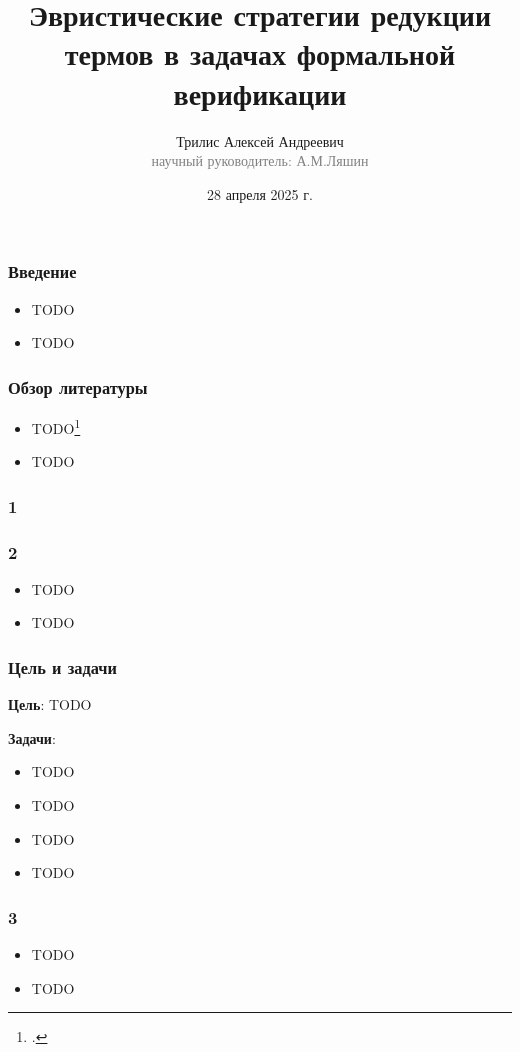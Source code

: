 \documentclass{beamer}
\begin{document}
\title[Стратегии редукции термов в верификации]{Эвристические стратегии редукции термов в задачах формальной верификации}
\author[Трилис А.А.]{Трилис Алексей Андреевич\\{\footnotesize\textcolor{gray}{научный руководитель: А.М.Ляшин}}}
\date{28 апреля 2025 г.}
\frame{\titlepage}

\begin{frame}\frametitle{Введение}
\begin{itemize}
  \item TODO
  \item TODO
\end{itemize}
\end{frame}

\lstset{language=haskell}
\begin{frame}\frametitle{Обзор литературы}
\begin{itemize}
  \item TODO\footcite{example}
  \item TODO
\end{itemize}
\end{frame}

\begin{frame}\frametitle{1}
\end{frame}

\begin{frame}\frametitle{2}
\begin{itemize}
  \item TODO
  \item TODO
\end{itemize}
\end{frame}

\begin{frame}\frametitle{Цель и задачи}
\textbf{Цель}: TODO

\textbf{Задачи}:
\begin{itemize}
  \item TODO
  \item TODO
  \item TODO
  \item TODO
\end{itemize}
\end{frame}

\begin{frame}\frametitle{3}
\begin{itemize}
  \item TODO
  \item TODO
\end{itemize}
\end{frame}
\end{document}
